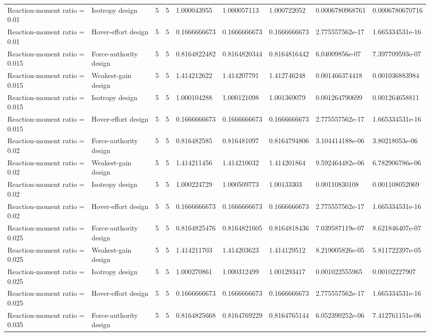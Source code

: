\begin{tabular}{@{}lllllllll@{}}
Reaction-moment ratio = 0.01 & Isotropy design & 5 & 5 & 1.000043955 & 1.000057113 & 1.000722052 & 0.0006780968761 & 0.0006780670716 \\
Reaction-moment ratio = 0.01 & Hover-effort design & 5 & 5 & 0.1666666673 & 0.1666666673 & 0.1666666673 & 2.775557562e-17 & 1.665334531e-16 \\
Reaction-moment ratio = 0.015 & Force-authority design & 5 & 5 & 0.8164822482 & 0.8164820344 & 0.8164816442 & 6.04009856e-07 & 7.397709593e-07 \\
Reaction-moment ratio = 0.015 & Weakest-gain design & 5 & 5 & 1.414212622 & 1.414207791 & 1.412746248 & 0.001466374418 & 0.001036883984 \\
Reaction-moment ratio = 0.015 & Isotropy design & 5 & 5 & 1.000104288 & 1.000121098 & 1.001369079 & 0.001264790699 & 0.001264658811 \\
Reaction-moment ratio = 0.015 & Hover-effort design & 5 & 5 & 0.1666666673 & 0.1666666673 & 0.1666666673 & 2.775557562e-17 & 1.665334531e-16 \\
Reaction-moment ratio = 0.02 & Force-authority design & 5 & 5 & 0.816482585 & 0.816481097 & 0.8164794806 & 3.104414188e-06 & 3.80218053e-06 \\
Reaction-moment ratio = 0.02 & Weakest-gain design & 5 & 5 & 1.414211456 & 1.414210032 & 1.414201864 & 9.592464482e-06 & 6.782906786e-06 \\
Reaction-moment ratio = 0.02 & Isotropy design & 5 & 5 & 1.000224729 & 1.000509773 & 1.00133303 & 0.00110830108 & 0.001108052069 \\
Reaction-moment ratio = 0.02 & Hover-effort design & 5 & 5 & 0.1666666673 & 0.1666666673 & 0.1666666673 & 2.775557562e-17 & 1.665334531e-16 \\
Reaction-moment ratio = 0.025 & Force-authority design & 5 & 5 & 0.8164825476 & 0.8164821605 & 0.8164818436 & 7.039587119e-07 & 8.621846407e-07 \\
Reaction-moment ratio = 0.025 & Weakest-gain design & 5 & 5 & 1.414211703 & 1.414203623 & 1.414129512 & 8.219005826e-05 & 5.811722397e-05 \\
Reaction-moment ratio = 0.025 & Isotropy design & 5 & 5 & 1.000270861 & 1.000312499 & 1.001293417 & 0.001022555965 & 0.00102227907 \\
Reaction-moment ratio = 0.025 & Hover-effort design & 5 & 5 & 0.1666666673 & 0.1666666673 & 0.1666666673 & 2.775557562e-17 & 1.665334531e-16 \\
Reaction-moment ratio = 0.035 & Force-authority design & 5 & 5 & 0.8164825668 & 0.8164769229 & 0.8164765144 & 6.052390252e-06 & 7.412761151e-06 \\

\end{tabular}
